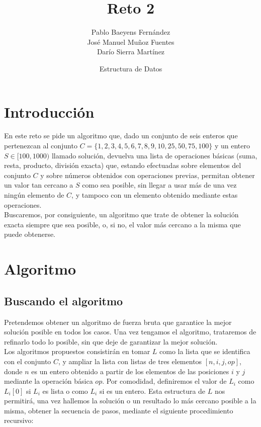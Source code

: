 \documentclass{article}
\title{Reto 2}
\date{Estructura de Datos}
\author{Pablo Baeyens Fernández\\José Manuel Muñoz Fuentes\\Darío Sierra Martínez}
\begin{document}
\maketitle

\section{Introducción}
En este reto se pide un algoritmo que, dado un conjunto de seis enteros que
pertenezcan al conjunto $C = \{1, 2, 3, 4, 5, 6, 7, 8, 9, 10, 25, 50, 75, 100\}$
y un entero $S \in [100, 1000)$ llamado solución, devuelva una lista de
operaciones básicas (suma, resta, producto, división exacta) que, estando
efectuadas sobre elementos del conjunto $C$ y sobre números obtenidos con
operaciones previas, permitan obtener un valor tan cercano a $S$ como sea
posible, sin llegar a usar más de una vez ningún elemento de $C$, y tampoco con
un elemento obtenido mediante estas operaciones. \\

Buscaremos, por consiguiente, un algoritmo que trate de obtener la solución
exacta siempre que sea posible, o, si no, el valor más cercano a la misma que
puede obtenerse.

\section{Algoritmo}
\subsection{Buscando el algoritmo}
Pretendemos obtener un algoritmo de fuerza bruta que garantice la mejor solución
posible en todos los casos. Una vez tengamos el algoritmo, trataremos de
refinarlo todo lo posible, sin que deje de garantizar la mejor solución.\\

Los algoritmos propuestos consistirán en tomar $L$ como la lista que se
identifica con el conjunto $C$, y ampliar la lista con listas de tres elementos
$[n, i, j, op]$, donde $n$ es un entero obtenido a partir de los elementos de
las posiciones $i$ y $j$ mediante la operación básica $op$. Por comodidad,
definiremos el valor de $L_i$ como $L_i[0]$ si $L_i$ es lista o como $L_i$ si es
un entero. Esta estructura de $L$ nos permitirá, una vez hallemos la solución o
un resultado lo más cercano posible a la misma, obtener la secuencia de pasos,
mediante el siguiente procedimiento recursivo: \\
\end{document}
